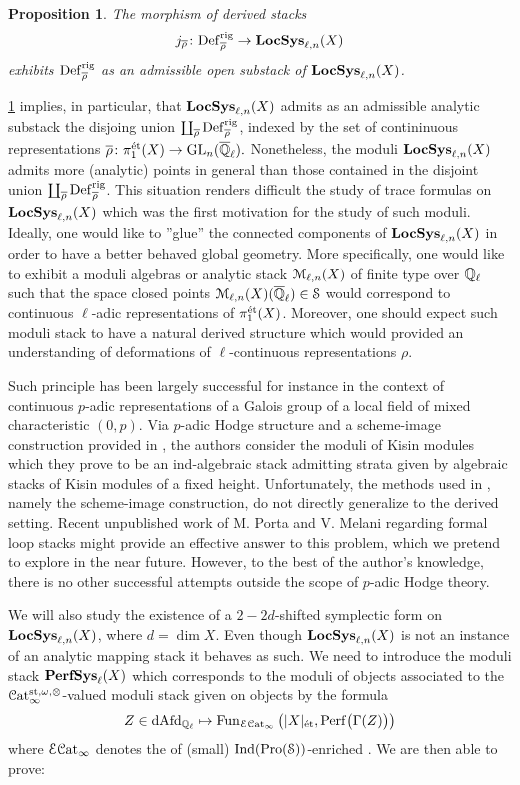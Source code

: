 \documentclass[10pt,a4paper]{amsart}
\numberwithin{equation}{subsection}
\theoremstyle{plain}
\newtheorem{prop}[theorem]{Proposition}
\theoremstyle{definition}
\theoremstyle{remark}
\numberwithin{equation}{section}
\begin{document}
\begin{prop} \label{intro:disj_u}
The morphism of derived stacks
    \[
       j_{\overline{\rho}} \colon \mathbf{\mathrm{Def}}^{\mathrm{rig}}_{\overline{\rho}} \to \mathbf{LocSys}_{\ell, n}(X)
    \]
exhibits $\mathbf{\mathrm{Def}}^{\mathrm{rig}}_{\overline{\rho}}$ as an admissible open substack of
$\mathbf{LocSys}_{\ell, n}(X)$.
\end{prop}

\cref{intro:disj_u} implies, in particular, that $\mathbf{LocSys}_{\ell, n}(X)$ admits as an admissible analytic substack the disjoing union $\coprod_{\overline{\rho}} \mathbf{\mathrm{Def}}^{\mathrm{rig}}_{\overline{\rho}}$, indexed
by the set of contininuous representations $\overline{\rho} \colon \pi_1^{\text{\'et}}(X) \to \mathrm{GL}_n(\overline{\mathbb{Q}}_\ell).$ Nonetheless, the moduli $\mathbf{LocSys}_{\ell, n}(X)$ admits more (analytic) points in general
than those contained in the disjoint union $\coprod_{\overline{\rho}} \mathbf{\mathrm{Def}}^{\mathrm{rig}}_{\overline{\rho}}$. This situation renders difficult the study of trace formulas on $\mathbf{LocSys}_{\ell, n}(X)$ which was the
first motivation for the study of such moduli. Ideally, one would like to ''glue'' the connected components of $\mathbf{LocSys}_{\ell, n}(X)$ in order to have a better behaved global geometry. More 
specifically,
one would like to exhibit a moduli algebras or analytic stack $\mathcal M_{\ell, n}(X)$ of finite type over $\mathbb{Q}_\ell$ such that the space closed points $\mathcal M_{\ell, n}(X)(\overline{\mathbb{Q}}_\ell) \in 
\mathcal S$ would correspond to
continuous $\ell$-adic representations of $\pi_1^{\text{\'et}}(X)$. Moreover, one should expect such moduli stack to have a natural derived structure which would provided an understanding of
deformations
of $\ell$-continuous representations $\rho$.

Such principle has been largely successful for instance in the context of continuous $p$-adic representations of a Galois group of a local field of mixed characteristic $(0,p)$. Via $p$-adic
Hodge structure and a scheme-image construction provided in \cite{gee_sch_image}, the authors consider the moduli of Kisin modules which they prove to be an ind-algebraic stack admitting 
strata
given by algebraic stacks of Kisin modules of a fixed height. Unfortunately, the methods used in \cite{gee_sch_image}, namely the scheme-image construction, do not directly generalize to
the
derived setting. Recent unpublished work of M. Porta and V. Melani regarding formal loop stacks might provide an effective answer to this problem, which we pretend to explore in the near
future. However, to the best of the author's knowledge,
there is no other successful attempts outside the scope of $p$-adic Hodge theory.


We will also study the existence of a $2-2d$-shifted symplectic form on $\mathbf{LocSys}_{\ell, n}(X)$, where $d = \dim  X$. Even though $\mathbf{LocSys}_{\ell, n}(X)$ is not an instance of an analytic mapping stack it behaves
as such. We need to introduce the moduli stack $\mathbf{PerfSys}_{\ell}(X)$ which corresponds to the moduli of objects associated to the $\mathcal{C}\mathrm{at}^{\mathrm{st}, \omega, \otimes}_{\infty}$-valued moduli stack given on objects
by the formula
    \[
        Z \in \mathrm{dAfd}_{\mathbb{Q}_\ell} \mapsto \mathrm{Fun}_{\mathcal E \mathcal{C}\mathrm{at}_\infty} \left( \vert X \vert_{\text{\'et}}, \mathrm{Perf} \big( \Gamma(Z ) \big) \right)
    \]
where $\mathcal E\mathcal{C}\mathrm{at}_\infty$ denotes the \infcat of (small) $\mathrm{Ind}( \mathrm{Pro}(\mathcal S))$-enriched \infcats. We are then able to prove:
\end{document}
